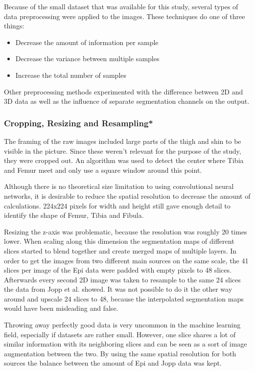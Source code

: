 Because of the small dataset that was available for this study, several types of data preprocessing were applied to the images. These techniques do one of three things:

\begin{itemize}
\item Decrease the amount of information per sample
\item Decrease the variance between multiple samples
\item Increase the total number of samples
\end{itemize}

Other preprocessing methods experimented with the difference between 2D and 3D data as well as the influence of separate segmentation channels on the output.

\subsubsection{Cropping, Resizing and Resampling*}

The framing of the raw images included large parts of the thigh and shin to be visible in the picture. Since these weren't relevant for the purpose of the study, they were cropped out. An algorithm was used to detect the center where Tibia and Femur meet and only use a square window around this point.

Although there is no theoretical size limitation to using convolutional neural networks, it is desirable to reduce the spatial resolution to decrease the amount of calculations. 224x224 pixels for width and height still gave enough detail to identify the shape of Femur, Tibia and Fibula.

Resizing the z-axis was problematic, because the resolution was roughly 20 times lower. When scaling along this dimension the segmentation maps of different slices started to blend together and create merged maps of multiple layers. In order to get the images from two different main sources on the same scale, the 41 slices per image of the Epi data were padded with empty pixels to 48 slices. Afterwards every second 2D image was taken to resample to the same 24 slices the data from Jopp et al. showed. It was not possible to do it the other way around and upscale 24 slices to 48, because the interpolated segmentation maps would have been misleading and false.

Throwing away perfectly good data is very uncommon in the machine learning field, especially if datasets are rather small. However, one slice shares a lot of similar information with its neighboring slices and can be seen as a sort of image augmentation between the two. By using the same spatial resolution for both sources the balance between the amount of Epi and Jopp data was kept.

